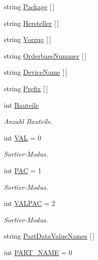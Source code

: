 \begin{DoxyCompactItemize}
\item 
string \hyperlink{_platzhalter_ersetzen_8ulp_a36b57fe679881487796855a589fbfb85}{Package} \mbox{[}$\,$\mbox{]}
\item 
string \hyperlink{_platzhalter_ersetzen_8ulp_a03dd05fe151d0e9f9edf96078bc234d4}{Hersteller} \mbox{[}$\,$\mbox{]}
\item 
string \hyperlink{_platzhalter_ersetzen_8ulp_a773ea3bd03d30f9371dda8ee12a97b3a}{Vorzug} \mbox{[}$\,$\mbox{]}
\item 
string \hyperlink{_platzhalter_ersetzen_8ulp_a57ba39a1335c8ae9ef4eb8314d51160e}{Orderbase\+Nummer} \mbox{[}$\,$\mbox{]}
\item 
string \hyperlink{_platzhalter_ersetzen_8ulp_add6cc63e92e68ae325b1ecb08776c9b9}{Device\+Name} \mbox{[}$\,$\mbox{]}
\item 
string \hyperlink{_platzhalter_ersetzen_8ulp_aadcab157eddcbfbc94bcde5363c32934}{Prefix} \mbox{[}$\,$\mbox{]}
\item 
int \hyperlink{_platzhalter_ersetzen_8ulp_a82a1393e9fe80f33f56eeeb9b8d2195c}{Bauteile}
\begin{DoxyCompactList}\small\item\em Anzahl Bauteile. \end{DoxyCompactList}\item 
int \hyperlink{_platzhalter_ersetzen_8ulp_a9d0755616c25d32c802e0786308b8fba}{V\+A\+L} = 0
\begin{DoxyCompactList}\small\item\em Sortier-\/\+Modus. \end{DoxyCompactList}\item 
int \hyperlink{_platzhalter_ersetzen_8ulp_af42346d5e4cb2b5ba2208adc44464398}{P\+A\+C} = 1
\begin{DoxyCompactList}\small\item\em Sortier-\/\+Modus. \end{DoxyCompactList}\item 
int \hyperlink{_platzhalter_ersetzen_8ulp_a8bdb0b537df4fe662061eef27e1f9a5e}{V\+A\+L\+P\+A\+C} = 2
\begin{DoxyCompactList}\small\item\em Sortier-\/\+Modus. \end{DoxyCompactList}\item 
string \hyperlink{_platzhalter_ersetzen_8ulp_aa91492c222928815209aa6f685876271}{Part\+Data\+Value\+Names} \mbox{[}$\,$\mbox{]}
\item 
int \hyperlink{_platzhalter_ersetzen_8ulp_a20b95608e9793b5cac8103d5881fe983}{P\+A\+R\+T\+\_\+\+N\+A\+M\+E} = 0

\end{DoxyCompactItemize}
